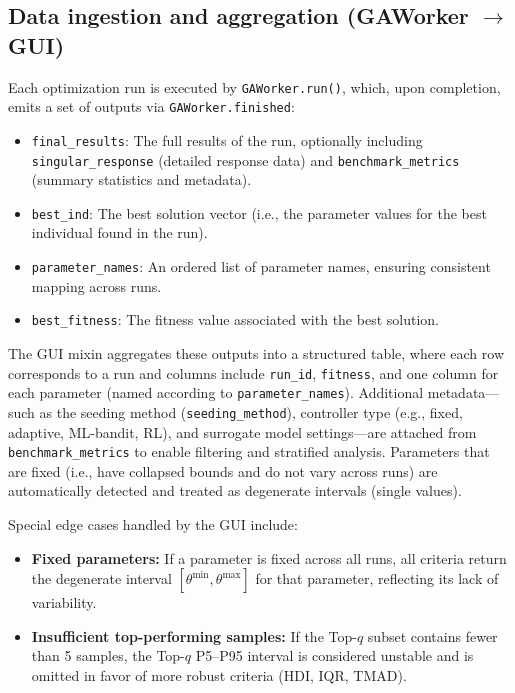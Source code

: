 \documentclass[12pt,a4paper]{article}
\begin{document}
\subsection{Data ingestion and aggregation (GAWorker $\rightarrow$ GUI)}
\label{subsec:ingestion}
Each optimization run is executed by \texttt{GAWorker.run()}, which, upon completion, emits a set of outputs via \texttt{GAWorker.finished}:
\begin{itemize}
    \item \texttt{final\_results}: The full results of the run, optionally including \texttt{singular\_response} (detailed response data) and \texttt{benchmark\_metrics} (summary statistics and metadata).
    \item \texttt{best\_ind}: The best solution vector (i.e., the parameter values for the best individual found in the run).
    \item \texttt{parameter\_names}: An ordered list of parameter names, ensuring consistent mapping across runs.
    \item \texttt{best\_fitness}: The fitness value associated with the best solution.
\end{itemize}
The GUI mixin aggregates these outputs into a structured table, where each row corresponds to a run and columns include \texttt{run\_id}, \texttt{fitness}, and one column for each parameter (named according to \texttt{parameter\_names}). Additional metadata—such as the seeding method (\texttt{seeding\_method}), controller type (e.g., fixed, adaptive, ML-bandit, RL), and surrogate model settings—are attached from \texttt{benchmark\_metrics} to enable filtering and stratified analysis. Parameters that are fixed (i.e., have collapsed bounds and do not vary across runs) are automatically detected and treated as degenerate intervals (single values).

Special edge cases handled by the GUI include:
\begin{itemize}
    \item \textbf{Fixed parameters:} If a parameter is fixed across all runs, all criteria return the degenerate interval $[\theta^{\min},\theta^{\max}]$ for that parameter, reflecting its lack of variability.
    \item \textbf{Insufficient top-performing samples:} If the Top-$q$ subset contains fewer than 5 samples, the Top-$q$ P5--P95 interval is considered unstable and is omitted in favor of more robust criteria (HDI, IQR, TMAD).
\end{itemize}
\end{document}
